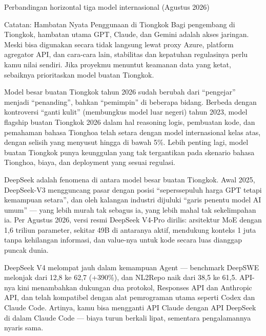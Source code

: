 \begin{center}\small\color{gray}Perbandingan horizontal tiga model internasional (Agustus 2026)\end{center}

\begin{tcbwarn}{Catatan: Hambatan Nyata Penggunaan di Tiongkok}
Bagi pengembang di Tiongkok, hambatan utama GPT, Claude, dan Gemini adalah akses jaringan. Meski bisa digunakan secara tidak langsung lewat proxy Azure, platform agregator API, dan cara-cara lain, stabilitas dan kepatuhan regulasinya perlu kamu nilai sendiri. Jika proyekmu menuntut keamanan data yang ketat, sebaiknya prioritaskan model buatan Tiongkok.

\end{tcbwarn}


Model besar buatan Tiongkok tahun 2026 sudah berubah dari “pengejar” menjadi “penanding”, bahkan “pemimpin” di beberapa bidang. Berbeda dengan kontroversi “ganti kulit” (membungkus model luar negeri) tahun 2023, model flagship buatan Tiongkok 2026 dalam hal reasoning logis, pembuatan kode, dan pemahaman bahasa Tionghoa telah setara dengan model internasional kelas atas, dengan selisih yang menyusut hingga di bawah 5\%. Lebih penting lagi, model buatan Tiongkok punya keunggulan yang tak tergantikan pada skenario bahasa Tionghoa, biaya, dan deployment yang sesuai regulasi.


DeepSeek adalah fenomena di antara model besar buatan Tiongkok. Awal 2025, DeepSeek-V3 mengguncang pasar dengan posisi “seperssepuluh harga GPT tetapi kemampuan setara”, dan oleh kalangan industri dijuluki “garis penentu model AI umum” — yang lebih murah tak sebagus ia, yang lebih mahal tak sekelimpahan ia. Per Agustus 2026, versi resmi DeepSeek V4-Pro dirilis: arsitektur MoE dengan 1,6 triliun parameter, sekitar 49B di antaranya aktif, mendukung konteks 1 juta tanpa kehilangan informasi, dan value-nya untuk kode secara luas dianggap puncak dunia.

DeepSeek V4 melompat jauh dalam kemampuan Agent — benchmark DeepSWE melonjak dari 12,8 ke 62,7 (+390\%), dan NL2Repo naik dari 38,5 ke 61,5. API-nya kini menambahkan dukungan dua protokol, Responses API dan Anthropic API, dan telah kompatibel dengan alat pemrograman utama seperti Codex dan Claude Code. Artinya, kamu bisa mengganti API Claude dengan API DeepSeek di dalam Claude Code — biaya turun berkali lipat, sementara pengalamannya nyaris sama.

